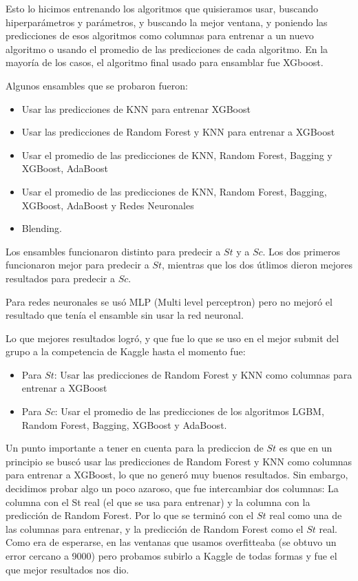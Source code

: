\documentclass[a4paper, 12pt]{article}
\begin{document}
Esto lo hicimos entrenando los algoritmos que quisieramos usar, buscando hiperparámetros y parámetros, y buscando la mejor ventana, y poniendo las predicciones de esos algoritmos como columnas para entrenar a un nuevo algoritmo o usando el promedio de las predicciones de cada algoritmo.
En la mayoría de los casos, el algoritmo final usado para ensamblar fue XGboost.

Algunos ensambles que se probaron fueron:
\begin{itemize}
    \item Usar las predicciones de KNN para entrenar XGBoost
    \item Usar las predicciones de Random Forest y KNN para entrenar a XGBoost
    \item Usar el promedio de las predicciones de KNN, Random Forest, Bagging y XGBoost, AdaBoost
    \item Usar el promedio de las predicciones de KNN, Random Forest, Bagging, XGBoost, AdaBoost y Redes Neuronales
    \item Blending.
\end{itemize}

Los ensambles funcionaron distinto para predecir a $St$ y a $Sc$.
Los dos primeros funcionaron mejor para predecir a $St$, mientras que los dos útlimos dieron mejores resultados para predecir a $Sc$.

Para redes neuronales se usó MLP (Multi level perceptron) pero no mejoró el resultado que tenía el ensamble sin usar la red neuronal.

Lo que mejores resultados logró, y que fue lo que se uso en el mejor submit del grupo a la competencia de Kaggle hasta el momento fue:
\begin{itemize}
    \item Para $St$: Usar las predicciones de Random Forest y KNN como columnas para entrenar a XGBoost 
    \item Para $Sc$: Usar el promedio de las predicciones de los algoritmos LGBM, Random Forest, Bagging, XGBoost y AdaBoost.
\end{itemize}

Un punto importante a tener en cuenta para la prediccion de $St$ es que en un principio se buscó usar las predicciones de Random Forest y KNN como columnas para entrenar a XGBoost, lo que no generó muy buenos resultados. 
Sin embargo, decidimos probar algo un poco azaroso, que fue intercambiar dos columnas: La columna con el St real (el que se usa para entrenar) y la columna con la predicción de Random Forest. Por lo que se terminó con el $St$ real como una de las columnas para entrenar, y la predicción de Random Forest como el $St$ real.
Como era de esperarse, en las ventanas que usamos overfitteaba (se obtuvo un error cercano a 9000) pero probamos subirlo a Kaggle de todas formas y fue el que mejor resultados nos dio.
\end{document}
